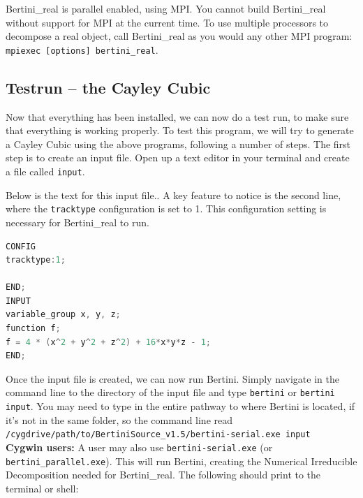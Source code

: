 Bertini\_real is parallel enabled, using MPI.  You cannot build Bertini\_real without support for MPI at the current time.   To use multiple processors to decompose a real object, call Bertini\_real as you would any other MPI program: \texttt{mpiexec [options] bertini\_real}.











\subsection{Testrun -- the Cayley Cubic}

Now that everything has been installed, we can now do a test run, to make sure that everything is working properly. To test this program, we will try to generate a Cayley Cubic using the above programs, following a number of steps. The first step is to create an input file. Open up a text editor in your terminal and create a file called \texttt{input}. 

Below is the text for this input file.. A key feature to notice is the second line, where the \texttt{tracktype} configuration is set to 1. This configuration setting is necessary for Bertini\_real to run. 

\begin{center}\begin{minipage}{0.9\linewidth}
\begin{lstlisting}[language=c++, caption={\tt input} for the Cayley Cubic, captionpos=b]
CONFIG 
tracktype:1;

END;
INPUT
variable_group x, y, z;
function f;
f = 4 * (x^2 + y^2 + z^2) + 16*x*y*z - 1;
END;
\end{lstlisting}
\end{minipage}\end{center}

Once the input file is created, we can now run Bertini. Simply navigate in the command line to the directory of the input file and type \texttt{bertini} or \texttt{bertini input}.  You may need to type in the entire pathway to where Bertini is located, if it's not in the same folder, so the command line read \newline \texttt{/cygdrive/path/to/BertiniSource\_v1.5/bertini-serial.exe input}\- \\ \textbf{Cygwin users:} A user may also use \texttt{bertini-serial.exe} (or \texttt{bertini\_parallel.exe}). This will run Bertini, creating the Numerical Irreducible Decomposition needed for Bertini\_real. The following should print to the terminal or shell:


